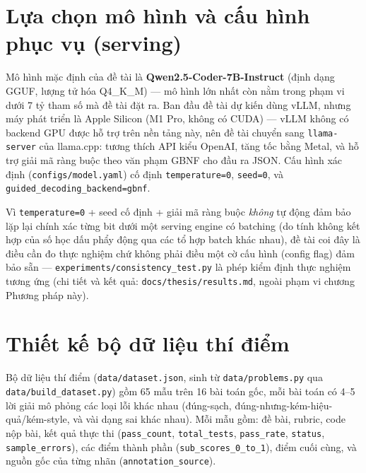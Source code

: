 \documentclass[a4paper,12pt]{report}
\begin{document}
\section{Lựa chọn mô hình và cấu hình phục vụ (serving)}

Mô hình mặc định của đề tài là \textbf{Qwen2.5-Coder-7B-Instruct} (định
dạng GGUF, lượng tử hóa Q4\_K\_M) — mô hình lớn nhất còn nằm trong phạm vi
dưới 7 tỷ tham số mà đề tài đặt ra. Ban đầu đề tài dự kiến dùng vLLM, nhưng
máy phát triển là Apple Silicon (M1 Pro, không có CUDA) — vLLM không có
backend GPU được hỗ trợ trên nền tảng này, nên đề tài chuyển sang
\texttt{llama-server} của llama.cpp: tương thích API kiểu OpenAI, tăng tốc
bằng Metal, và hỗ trợ giải mã ràng buộc theo văn phạm GBNF cho đầu ra JSON.
Cấu hình xác định (\texttt{configs/model.yaml}) cố định
\texttt{temperature=0}, \texttt{seed=0}, và
\texttt{guided\_decoding\_backend=gbnf}.

Vì \texttt{temperature=0} + seed cố định + giải mã ràng buộc \emph{không}
tự động đảm bảo lặp lại chính xác từng bit dưới một serving engine có
batching (do tính không kết hợp của số học dấu phẩy động qua các tổ hợp
batch khác nhau), đề tài coi đây là điều cần đo thực nghiệm chứ không phải
điều một cờ cấu hình (config flag) đảm bảo sẵn —
\texttt{experiments/consistency\_test.py} là phép kiểm định thực nghiệm
tương ứng (chi tiết và kết quả: \texttt{docs/thesis/results.md}, ngoài
phạm vi chương Phương pháp này).

\section{Thiết kế bộ dữ liệu thí điểm}
\label{sec:pilot-dataset}

Bộ dữ liệu thí điểm (\texttt{data/dataset.json}, sinh từ
\texttt{data/problems.py} qua \texttt{data/build\_dataset.py}) gồm 65 mẫu
trên 16 bài toán gốc, mỗi bài toán có 4--5 lời giải mô phỏng các loại lỗi
khác nhau (đúng-sạch, đúng-nhưng-kém-hiệu-quả/kém-style, và vài dạng sai
khác nhau). Mỗi mẫu gồm: đề bài, rubric, code nộp bài, kết quả thực thi
(\texttt{pass\_count}, \texttt{total\_tests}, \texttt{pass\_rate},
\texttt{status}, \texttt{sample\_errors}), các điểm thành phần
(\texttt{sub\_scores\_0\_to\_1}), điểm cuối cùng, và nguồn gốc của từng
nhãn (\texttt{annotation\_source}).
\end{document}
